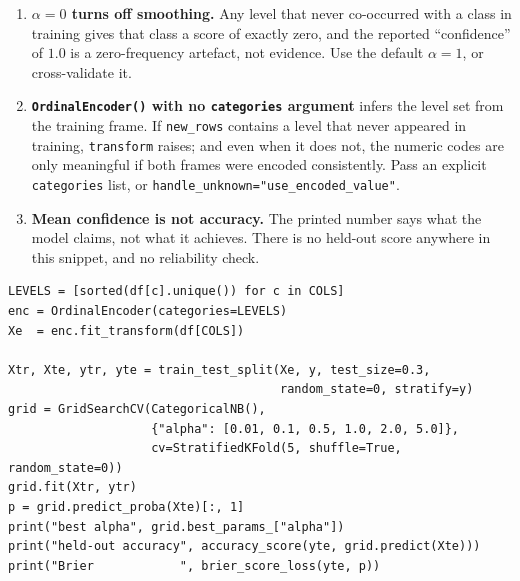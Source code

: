 \documentclass[11pt]{article}
\begin{document}
\begin{enumerate}[leftmargin=*, itemsep=0.7em]
  \begin{enumerate}[label=(\arabic*)]
    \item \textbf{$\alpha = 0$ turns off smoothing.} Any level that never
      co-occurred with a class in training gives that class a score of
      exactly zero, and the reported ``confidence'' of $1.0$ is a
      zero-frequency artefact, not evidence. Use the default $\alpha = 1$, or
      cross-validate it.
    \item \textbf{\texttt{OrdinalEncoder()} with no \texttt{categories}
      argument} infers the level set from the training frame. If
      \texttt{new\_rows} contains a level that never appeared in training,
      \texttt{transform} raises; and even when it does not, the numeric codes
      are only meaningful if both frames were encoded consistently. Pass an
      explicit \texttt{categories} list, or
      \texttt{handle\_unknown="use\_encoded\_value"}.
    \item \textbf{Mean confidence is not accuracy.} The printed number says
      what the model claims, not what it achieves. There is no held-out
      score anywhere in this snippet, and no reliability check.
  \end{enumerate}

\begin{lstlisting}
LEVELS = [sorted(df[c].unique()) for c in COLS]
enc = OrdinalEncoder(categories=LEVELS)
Xe  = enc.fit_transform(df[COLS])

Xtr, Xte, ytr, yte = train_test_split(Xe, y, test_size=0.3,
                                      random_state=0, stratify=y)
grid = GridSearchCV(CategoricalNB(),
                    {"alpha": [0.01, 0.1, 0.5, 1.0, 2.0, 5.0]},
                    cv=StratifiedKFold(5, shuffle=True, random_state=0))
grid.fit(Xtr, ytr)
p = grid.predict_proba(Xte)[:, 1]
print("best alpha", grid.best_params_["alpha"])
print("held-out accuracy", accuracy_score(yte, grid.predict(Xte)))
print("Brier            ", brier_score_loss(yte, p))
\end{lstlisting}


\end{enumerate}
\end{document}
